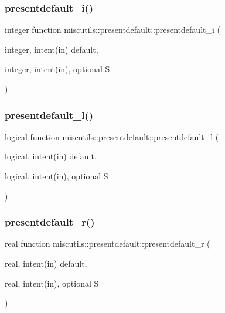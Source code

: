 \mbox{\label{interfacemiscutils_1_1presentdefault_a021d39c65f43568dcc02919695b1be60}} 
\subsubsection{\texorpdfstring{presentdefault\+\_\+i()}{presentdefault\_i()}}
{\footnotesize\ttfamily integer function miscutils\+::presentdefault\+::presentdefault\+\_\+i (\begin{DoxyParamCaption}\item[{integer, intent(in)}]{default,  }\item[{integer, intent(in), optional}]{S }\end{DoxyParamCaption})}

\mbox{\label{interfacemiscutils_1_1presentdefault_a9dad100c88a0f78ffc4e4fce0c2effd5}} 
\subsubsection{\texorpdfstring{presentdefault\+\_\+l()}{presentdefault\_l()}}
{\footnotesize\ttfamily logical function miscutils\+::presentdefault\+::presentdefault\+\_\+l (\begin{DoxyParamCaption}\item[{logical, intent(in)}]{default,  }\item[{logical, intent(in), optional}]{S }\end{DoxyParamCaption})}

\mbox{\label{interfacemiscutils_1_1presentdefault_a8b38f233fb9af34b06dfb4eb56ced739}} 
\subsubsection{\texorpdfstring{presentdefault\+\_\+r()}{presentdefault\_r()}}
{\footnotesize\ttfamily real function miscutils\+::presentdefault\+::presentdefault\+\_\+r (\begin{DoxyParamCaption}\item[{real, intent(in)}]{default,  }\item[{real, intent(in), optional}]{S }\end{DoxyParamCaption})}

